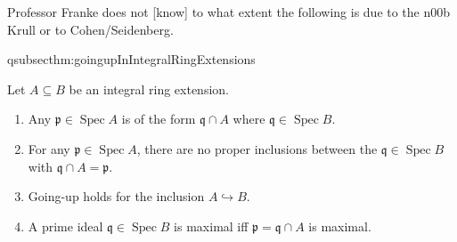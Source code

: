 \documentclass[DIV=14,parskip=full,pointednumbers]{scrartcl}
\newenvironment{alphanumerate}{\begin{enumerate}[label={$(\alph*)$},ref=\curthm]}{\end{enumerate}}
\theoremstyle{cthm}
\theoremstyle{cvarthm}
\theoremstyle{cdef}
\newcommand{\lbl}[1]{
	\label{#1}
	\ifmmode
	\expandafter\xdef\csname eqsubsec#1\endcsname{\thesubsection}
	\fi
}
\newcommand{\pp}{\mathfrak{p}}
\newcommand{\qq}{\mathfrak{q}}
\newcommand{\Spec}{\operatorname{Spec}}
\begin{document}
	Professor Franke does not [know] to what extent the following is due to the n00b Krull or to Cohen/Seidenberg.
	\begin{thm}\lbl{thm:goingupInIntegralRingExtensions}
		Let $A\subseteq B$ be an integral ring extension.
		\begin{alphanumerate}
		\item 
			 Any $\pp\in\Spec A$ is of the form  $\qq\cap A$ where $\qq\in\Spec B$.
		\item 
			For any $\pp\in \Spec A$, there are no proper inclusions between the $\qq\in\Spec B$ with $\qq\cap A = \pp$.
		\item
			Going-up holds for the inclusion $A\hookrightarrow B$.
		\item
			A prime ideal $\qq\in\Spec B$ is maximal iff $\pp = \qq\cap A$ is maximal.
		\end{alphanumerate}
	\end{thm}
\end{document}
